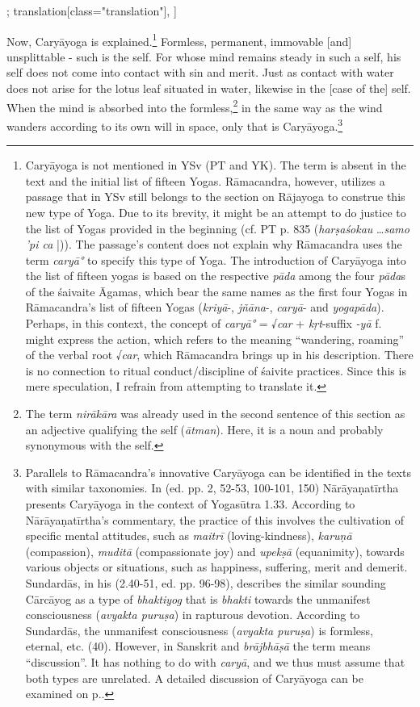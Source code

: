 \begin{alignment}[
  texts=edition[class="edition"];
  translation[class="translation"],
  ]
\begin{translation}
\begin{tlate}[p18_01]
      Now, Caryāyoga is explained.\footnote{Caryāyoga is not mentioned in YSv (PT and YK). The term is absent in the text and the initial list of fifteen Yogas. Rāmacandra, however, utilizes a passage that in YSv still belongs to the section on Rājayoga to construe this new type of Yoga. Due to its brevity, it might be an attempt to do justice to the list of Yogas provided in the beginning (cf. PT p. 835 (\textit{harṣaśokau} \ldots \textit{samo 'pi ca} |)). The passage's content does not explain why Rāmacandra uses the term \textit{caryā°} to specify this type of Yoga. The introduction of Caryāyoga into the list of fifteen yogas is based on the respective \textit{pāda} among the four \textit{pāda}s of the śaivaite Āgamas, which bear the same names as the first four Yogas in Rāmacandra's list of fifteen Yogas (\textit{kriyā}-, \textit{jñāna}-, \textit{caryā}- and \textit{yogapāda}). Perhaps, in this context, the concept of \textit{caryā°} = √\textit{car} + \textit{kṛt}-suffix \textit{-yā} f. might express the action, which refers to the meaning ``wandering, roaming'' of the verbal root √\textit{car}, which Rāmacandra brings up in his description. There is no connection to ritual conduct/discipline of śaivite practices. Since this is mere speculation, I refrain from attempting to translate it.} Formless, permanent, immovable [and] unsplittable - such is the self. For whose mind remains steady in such a self, his self does not come into contact with sin and merit. Just as contact with water does not arise for the lotus leaf situated in water, likewise in the [case of the] self. When the mind is absorbed into the formless,\footnote{The term \textit{nirākāra} was already used in the second sentence of this section as an adjective qualifying the self (\textit{ātman}). Here, it is a noun and probably synonymous with the self.} in the same way as the wind wanders according to its own will in space, only that is Caryāyoga.\footnote{Parallels to Rāmacandra's innovative Caryāyoga can be identified in the texts with similar taxonomies. In  (ed. pp. 2, 52-53, 100-101, 150) Nārāyaṇatīrtha presents Caryāyoga in the context of Yogasūtra 1.33. According to Nārāyaṇatīrtha's commentary, the practice of this involves the cultivation of specific mental attitudes, such as \textit{maitrī} (loving-kindness), \textit{karuṇā} (compassion), \textit{muditā} (compassionate joy) and \textit{upekṣā} (equanimity), towards various objects or situations, such as happiness, suffering, merit and demerit. Sundardās, in his  (2.40-51, ed. pp. 96-98), describes the similar sounding Cārcāyog as a type of \textit{bhaktiyog} that is \textit{bhakti} towards the unmanifest consciousness (\textit{avyakta puruṣa}) in rapturous devotion. According to Sundardās, the unmanifest consciousness (\textit{avyakta puruṣa}) is formless, eternal, etc. (40). However, in Sanskrit and \textit{brājbhāṣā} the term means ``discussion''. It has nothing to do with \textit{caryā}, and we thus must assume that both types are unrelated. A detailed discussion of Caryāyoga can be examined on p.\pageref{caryayogaintro}.} 

\end{tlate}
\end{translation}
\end{alignment}
